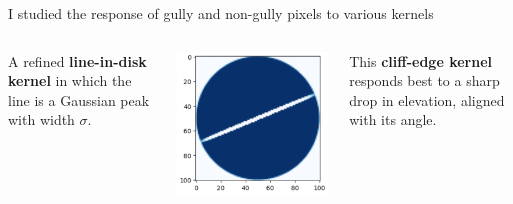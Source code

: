 \documentclass[aspectratio=169]{beamer}
\begin{document}
\begin{frame}{I studied the response of gully and non-gully pixels to various kernels}
\small
\vspace{0.5 cm}
\begin{columns}
\begin{minipage}{0.5\linewidth}
\raggedright A refined {\bf line-in-disk kernel} in which the line is a Gaussian peak with width $\sigma$.

\vspace{0.15 cm}
\includegraphics[width=\linewidth]{img/gaussian-line-in-disk-kernel.png}
\end{minipage}

\hfill \begin{minipage}{0.5\linewidth}
\vspace{-2.8 cm}
\raggedleft This {\bf cliff-edge kernel} responds best to a sharp drop in elevation, aligned with its angle.


\end{minipage}
\end{columns}
\end{frame}
\end{document}
